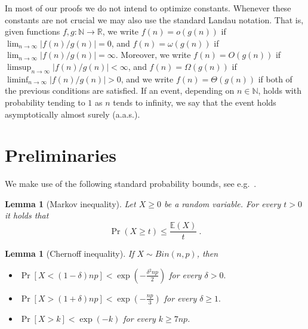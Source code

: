 \documentclass[11pt, a4paper]{article}
\numberwithin{equation}{section}
\numberwithin{figure}{section}
\newtheorem{lemma}[theorem]{Lemma}
\newcommand{\Prob}{\operatorname{Pr}}
\begin{document}
In most of our proofs we do not intend to optimize constants. Whenever these constants are not crucial we may also use the standard Landau notation. That is, given functions $f,g:\mathbb{N}\rightarrow \mathbb{R}$,
we write $f(n)=o(g(n))$ if $\lim_{n\rightarrow\infty} \left| f(n)/g(n) \right|=0$,
and $f(n)=\omega(g(n))$ if $\lim_{n\rightarrow\infty} \left| f(n)/g(n) \right| =\infty$.
Moreover, we write
$f(n)=O(g(n))$ if $\limsup_{n\rightarrow\infty} \left| f(n)/g(n) \right|<\infty$,
and $f(n)=\Omega(g(n))$ if $\liminf_{n\rightarrow\infty} \left| f(n)/g(n) \right| > 0$,
and we write $f(n)=\Theta(g(n))$ if both of the previous conditions are satisfied.
If an event, depending on $n\in\mathbb{N}$,
holds with probability tending to $1$
as $n$ tends to infinity, we say that the event holds asymptotically almost surely (a.a.s.).







\bigskip


\section{Preliminaries}\label{sec:prelim}

We make use of the following standard probability bounds, see e.g.~\cite{janson2011random}.

\begin{lemma}[Markov inequality]\label{lem:markov}
Let $X\geq 0$ be a random variable. For every $t > 0$ it holds that
$$
\Prob\left( X\geq t \right)
\leq \frac{\mathbb{E}(X)}{t}~ .
$$
\end{lemma}

\begin{lemma}[Chernoff inequality]\label{lemma:Chernoff_standard}
If $X \sim Bin(n,p)$, then
\begin{itemize}
    \item[(a)] $\Prob[X<(1-\delta)np]<\exp\left(-\frac{\delta^2np}{2}\right)$ for every $\delta>0.$
    \item[(b)] $\Prob[X>(1+\delta)np]<\exp\left(-\frac{np}{3}\right)$ for every $\delta\geq 1.$
    \item[(c)] $\Prob[X>k]<\exp\left(-k\right)$ for every $k\geq 7np$.
\end{itemize}
\end{lemma} 
\end{document}
